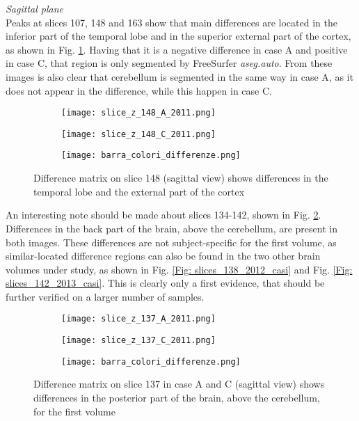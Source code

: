 \documentclass{article}
\begin{document}
	 
	\textit{Sagittal plane} 
	\\
	Peaks at slices 107, 148 and 163 show that main differences are located in the inferior part of the temporal lobe and in the superior external part of the cortex, as shown in Fig. \ref{Fig: slices_148_casi}. Having that it is a negative difference in case A and positive in case C, that region is only segmented by FreeSurfer \textsl{aseg.auto}. From these images is also clear that cerebellum is segmented in the same way in case A, as it does not appear in the difference, while this happen in case C.
	\begin{figure} [h!]
		\centering
		\begin{subfigure} [b] {0.45\linewidth} 				\texttt{[image: slice\_z\_148\_A\_2011.png]}
		\end{subfigure}
		\hfill
		\begin{subfigure} [b] {0.45\linewidth} \texttt{[image: slice\_z\_148\_C\_2011.png]}
		\end{subfigure}
		\begin{subfigure} [b] {0.08\linewidth} \texttt{[image: barra\_colori\_differenze.png]}
		\end{subfigure}
		\caption{Difference matrix on slice 148 (sagittal view) shows differences in the temporal lobe and the external part of the cortex}
		\label{Fig: slices_148_casi}
	\end{figure}
	\newpage
	An interesting note should be made about slices 134-142, shown in Fig. \ref{Fig: slices_137_casi}. 	Differences in the back part of the brain, above the cerebellum, are present in both images. These differences are not subject-specific for the first volume, as similar-located difference regions can also be found in the two other brain volumes under study, as shown in Fig. \ref{Fig: slices_138_2012_casi} and Fig. \ref{Fig: slices_142_2013_casi}. This is clearly only a first evidence, that should be further verified on a larger number of samples.
	\begin{figure} [h!]
		\centering
		\begin{subfigure} [b] {0.45\linewidth} 				\texttt{[image: slice\_z\_137\_A\_2011.png]}
		\end{subfigure}
		\hfill
		\begin{subfigure} [b] {0.45\linewidth} \texttt{[image: slice\_z\_137\_C\_2011.png]}
		\end{subfigure}
		\begin{subfigure} [b] {0.08\linewidth} \texttt{[image: barra\_colori\_differenze.png]}
		\end{subfigure}
		\caption{Difference matrix on slice 137 in case A and C (sagittal view) shows differences in the posterior part of the brain, above the cerebellum, for the first volume}
		\label{Fig: slices_137_casi}
	\end{figure}
\end{document}
